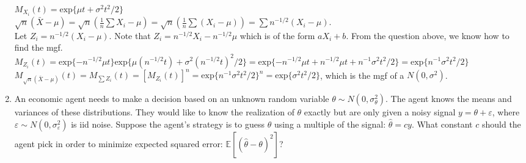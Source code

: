 \documentclass[12pt]{article}
\newif\ifsln
\renewcommand{\epsilon}{\varepsilon}
\newcommand{\E}{\mathbb{E}}
\begin{document}
\begin{enumerate}[1.]
$M_{X_{i}}(t) = \text{exp}\{\mu t + \sigma^{2}t^{2} / 2\}$\\

$\sqrt{n}(\bar{X} - \mu) = \sqrt{n}(\frac{1}{n}\sum X_{i} - \mu)=\sqrt{n}(\frac{1}{n}\sum (X_{i} - \mu)) = \sum n^{-1/2}(X_{i} - \mu)$.\\

Let $Z_{i} = n^{-1/2}(X_{i} - \mu)$. Note that $Z_{i} = n^{-1/2}X_{i} - n^{-1/2}\mu$ which is of the form $aX_{i} + b$. From the question above, we know how to find the mgf.\\

$M_{Z_{i}}(t) = \text{exp}\{-n^{-1/2}\mu t\} \text{exp}\{ \mu (n^{-1/2}t) + \sigma^{2} (n^{-1/2}t)^{2} / 2\} = \text{exp}\{ - n^{-1/2}\mu t + n^{-1/2}\mu t + n^{-1} \sigma^{2} t^{2} / 2\} = \text{exp}\{  n^{-1} \sigma^{2} t^{2} / 2\}$\\

$M_{\sqrt{n}(\bar{X} - \mu)}(t) = M_{\sum Z_{i}}(t) = \left[ M_{Z_{i}}(t) \right]^{n} =\text{exp}\{  n^{-1} \sigma^{2} t^{2} / 2\}^{n} = \text{exp}\{ \sigma^{2} t^{2} / 2\} $, which is the mgf of a $N(0, \sigma^{2})$.
\fi




\item An economic agent needs to make a decision based on an unknown random variable $\theta \sim N(0, \sigma^{2}_{\theta})$. The agent knows the means and variances of these distributions. They would like to know the realization of $\theta$ exactly but are only given a noisy signal $y = \theta + \epsilon$, where $\epsilon \sim N(0, \sigma_{\epsilon}^{2})$ is iid noise. Suppose the agent's strategy is to guess $\theta$ using a multiple of the signal: $\hat{\theta} = c y$. What constant $c$ should the agent pick in order to minimize expected squared error: $\E [(\hat{\theta} - \theta)^{2}]$?

\ifsln
\textit{Solution:}\\
MSE = $\E[(\hat{\theta} - \theta)^{2}] = \E[ \hat{\theta}^{2} - 2 \hat{\theta}\theta + \theta^{2}] = \E[c^{2}y^{2} - 2cy\theta + \theta^{2}] = c^{2}\E[y^{2}] - 2c\E[y\theta] + \E[\theta^{2}] = c^{2}(\sigma^{2}_{\theta} + \sigma^{2}_{\epsilon}) - 2c \sigma^{2}_{\theta}  + \sigma^{2}\theta$\\

First order condition for a minimum is $\frac{\mathrm{d} MSE}{\mathrm{d}c} = 0 \implies 2c(\sigma^{2}_{\theta} + \sigma^{2}_{\epsilon}) - 2\sigma^{2}_{\theta} = 0 \implies c = \frac{\sigma^{2}_{\theta}}{\sigma^{2}_{\theta} + \sigma^{2}_{\epsilon}}$. \\

Second order condition is $\frac{\mathrm{d}^{2} MSE}{\mathrm{d}c^{2}} = 2 (\sigma^{2}_{\theta} + \sigma^{2}_{\epsilon}) > 0$, so we have a necessary and sufficient condition for a local minimum. Since the objective function is strictly convex, we have a global minimum.
\fi
\end{enumerate}
\end{document}
